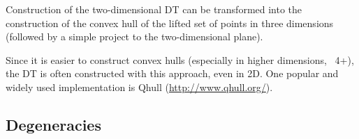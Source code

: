 %

 Construction of the two-dimensional DT can be transformed into the construction of the convex hull of the lifted set of points in three dimensions (followed by a simple project to the two-dimensional plane).

\begin{floatbox}
  \begin{kaobox-practice}[frametitle=\faCog\ How does it work in practice?]
    Since it is easier to construct convex hulls (especially in higher dimensions, \ie\ 4+), the DT is often constructed with this approach, even in 2D. One popular and widely used implementation is Qhull (\url{http://www.qhull.org/}).
  \end{kaobox-practice}
\end{floatbox}


%
\subsection{Degeneracies}%
\label{sec:degeneracies}

